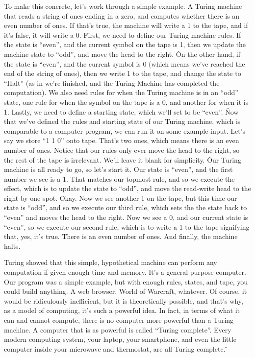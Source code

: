 \be
To make this concrete, let's work through a simple example. A Turing machine that reads a string of ones ending in a
zero, and computes whether there is an even number of ones. If that's true, the machine will write a 1 to the tape,
and if it's false, it will write a 0. First, we need to define our Turing machine rules. If the state is ``even'', and
the current symbol on the tape is 1, then we update the machine state to ``odd'', and move the head to the right. \v

On the other hand, if the state is ``even'', and the current symbol is 0 (which means we've reached the end of the
string of ones), then we write 1 to the tape, and change the state to ``Halt'' (as in we're finished, and the Turing
Machine has completed the computation). We also need rules for when the Turing machine is in an ``odd'' state, one rule
for when the symbol on the tape is a 0, and another for when it is 1. Lastly, we need to define a starting state,
which we'll set to be ``even''. \v

Now that we've defined the rules and starting state of our Turing machine, which is comparable to a computer program,
we can run it on some example input. Let's say we store ``1 1 0'' onto tape. That's two ones, which means there is an
even number of ones. Notice that our rules only ever move the head to the right, so the rest of the tape is
irrelevant. We'll leave it blank for simplicity. \v

Our Turing machine is all ready to go, so let's start it. Our state is ``even'', and the first number we see is a 1.
That matches our topmost rule, and so we execute the effect, which is to update the state to ``odd'', and move the
read-write head to the right by one spot. Okay. Now we see another 1 on the tape, but this time our state is ``odd'',
and so we execute our third rule, which sets the the state back to ``even'' and moves the head to the right. Now we
see a 0, and our current state is ``even'', so we execute our second rule, which is to write a 1 to the tape signifying
that, yes, it's true. There is an even number of ones. And finally, the machine halts.
\ee

Turing showed that this simple, hypothetical machine can perform any computation if given enough time and memory.
It's a general-purpose computer. Our program was a simple example, but with enough rules, states, and tape, you could
build anything. A web browser, World of Warcraft, whatever. Of course, it would be ridiculously inefficient, but it
is theoretically possible, and that's why, as a model of computing, it's such a powerful idea. In fact, in terms of
what it can and cannot compute, there is no computer more powerful than a Turing machine. A computer that is as
powerful is called ``Turing complete''. Every modern computing system, your laptop, your smartphone, and even the
little computer inside your microwave and thermostat, are all Turing complete. \v

